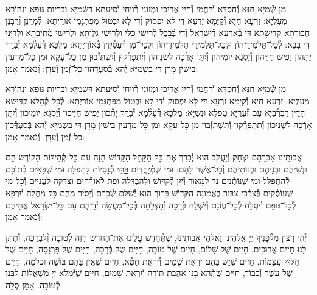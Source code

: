 \documentclass[twoside, openany, parskip=half, 11pt]{book}
\begin{document}

\shabbos\\
מִן שְׁ֯מַיָּא חִנָּא וְ֯חִסְדָּא וְ֯רַחֲמֵי וְ֯חַיֵּי אֲרִיכֵי וּמְזוֹנֵי רְ֯וִיחֵי וְ֯סִיַּעְתָּא דִשְּׁ֯מַיָּא וּבַרְיוּת גּוּפָא וּנְהוֹרָא מַעַלְיָא: זַרְעָא חַיָּא וְ֯קַיָּמָא זַרְעָא דִּי לֹא יִפְסוּק וְ֯דִי לָא יִבְטוּל מִפִּתְגָּמֵי אוֹרַיְתָא: לְ֯מָרָנָן וְ֯רַבָּנָן חֲבוּרָתָא קַדִּישָׁתָא דִּי בְ֯אַרְעָא דְ֯יִשְׂרָאֵל וְ֯דִי בְּ֯בָבֶל לְ֯רֵישֵׁי כַלֵּי וּלְרֵישֵׁי גַלְוָתָא וּלְרֵישֵׁי מְ֯תִיבָתָא וּלְדַיָּנֵי דִי בָבָא: לְ֯כׇל־תַּלְמִידֵיהוֹן וּלְכׇל־תַּלְמִידֵי תַלְמִידֵיהוֹן וּלְכׇל־מָן דְּ֯עָסְ֯קִין בְּ֯אוֹרַיְתָא: מַלְכָּא דְ֯עָלְ֯מָא יְ֯בָרֵךְ יַתְהוֹן יַפִּישׁ חַיֵּיהוֹן וְ֯יַסְגֵּא יוֹמֵיהוֹן וְ֯יִתֵּן אָרְ֯כָה לִשְׁנֵיהוֹן וְ֯יִתְפָּרְ֯קוּן וְ֯יִשְׁתֵּזְ֯בוּן מִן כׇּל־עָקָא וּמִן כׇּל־מַרְעִין בִּישִׁין מָרָן דִּי בִשְׁמַיָּא יְ֯הֵא בְּ֯סַעְדְּ֯הוֹן כׇּל־זְ֯מַן וְ֯עִדָּן: וְ֯נֹאמַר אָמֵן:



מִן שְׁ֯מַיָּא חִנָּא וְ֯חִסְדָּא וְ֯רַחֲמֵי וְ֯חַיֵּי אֲרִיכֵי וּמְזוֹנֵי רְ֯וִיחֵי וְ֯סִיַּעְתָּא דִּשְׁמַיָּא וּבַרְיוּת גּוּפָא וּנְהוֹרָא מַעַלְיָא: זַרְעָא חַיָּא וְ֯קַיָּמָא זַרְעָא דִּי לָא יִפְסוּק וְ֯דִי לָא יִבְטוּל מִפִּתְגָּמֵי אוֹרַיְתָא: לְ֯כׇל־קְ֯הָלָא קַדִּישָׁא הָדֵין רַבְרְ֯בַיָּא עִם זְ֯עֵרַיָּא טַפְלָא וּנְשַׁיָּא: מַלְכָּא דְ֯עָלְ֯מָא יְ֯בָרֵךְ יָתְ֯כוֹן יַפִּישׁ חַיֵּיכוֹן וְ֯יַסְגֵּא יוֹמֵיכוֹן וְ֯יִתֵּן אָרְ֯כָה לִשְׁנֵיכוֹן וְ֯תִתְפָּרְ֯קוּן וְ֯תִשְׁתֵּזְ֯בוּן מִן כׇּל־עָקָא וּמִן כׇּל־מַרְעִין בִּישִׁין מָרָן דִּי בִשְׁמַיָּא יְ֯הֵא בְּ֯סַעְדְּ֯כוֹן כׇּל־זְ֯מַן וְ֯עִדָּן: וְ֯נֹאמַר אָמֵן:

אֲבוֹתֵֽינוּ אַבְרָהָם יִצְחָק וְ֯יַעֲקֹב הוּא יְ֯בָרֵךְ אֶת־כׇּל־הַקָּהָל הַקָּדוֹשׁ הַזֶּה עִם כׇּל־קְ֯הִילּוֹת הַקּוֹדֶשׁ הֵם וּנְשֵׁיהֶם וּבְנֵיהֶם וּבְנוֹתֵיהֶם וְ֯כׇל־אֲשֶׁר לָהֶם: וּמִי שֶׁמְּ֯יַחֲדִים בׇׇׇּתֵּי כְ֯נֵסִיּוֹת לִתְפִלָּה וּמִי שֶׁבָּאִים בְּ֯תוֹכָם לְ֯הִתְפַּלֵּל וּמִי שֶׁנּוֹתְ֯נִים נֵר לַמָּאוֹר וְ֯יַֽיִן לְ֯קִדּוּשׁ וּלְהַבְדָּלָה וּפַת לְ֯אוֹרְ֯חִים וּצְדָקָה לַעֲנִיִּים וְ֯כׇל־מִי שֶׁעוֹסְ֯קִים בְּ֯צָרְ֯כֵי צִבּוּר בֶּאֱמוּנָה הַקָּדוֹשׁ בָּרוּךְ הוּא יְ֯שַׁלֵם שְׂ֯כָרָם וְ֯יָסִיר מֵהֶם כׇּל־מַחֲלָה וְ֯יִרְפָּא לְ֯כׇל־גּוּפָם וְ֯יִסְלַח לְ֯כׇל־עֲוֹנָם וְ֯יִשְׁלַח בְּ֯רָכָה וְ֯הַצְלָחָה בְּ֯כׇל־מַעֲשֵׂה יְ֯דֵיהֶם עִם כׇּל־יִשְׂרָאֵל אֲחֵיהֶם וְ֯נֹאמַר אָמֵן:







יְ֯הִי רָצוֹן מִלְּ֯פָנֶיךָ יְיָ אֱלֹהֵינוּ וֵאלֹהֵי אֲבוֹתֵינוּ,
שֶׁתְּ֯חַדֵּשׁ עָלֵינוּ אֶת־הַחֹדֶשׁ הַזֶּה לְ֯טוֹבָה וְ֯לִבְרָכָה,
וְ֯תִתֶּן לָנוּ חַיִּים אֲרוּכִים,
חַיִּים שֶׁל שָׁלוֹם,
חַיִּים שֶׁל טוֹבָה,
חַיִּים שֶׁל בְּ֯רָכָה,
חַיִּים שֶׁל פַּרְנָסָה,
חַיִּים שֶׁל חִלּוּץ עֲצָמוֹת,
חַיִּים שֶׁיֵשׁ בָּהֶם יִרְאַת שָׁמַיִם וְ֯יִרְאַת חֵטְ֯א,
חַיִּים שֶׁאֵין בָּהֶם בּוּשָׁה וּכְלִמָּה,
חַיִּים שֶׁל עשֶׁר וְ֯כָבוֹד,
חַיִּים שֶׁתְּ֯הֵא בָנוּ אַהֲבַת תּוֹרָה וְ֯יִרְאַת שָׁמַיִם,
חַיִּים שֶׁיְּ֯מַּלֵא יְיָ מִשְׁאֲלוֹת לִבֵּנוּ לְ֯טוֹבָה. אָמֵן סֶלָה:
\end{document}
